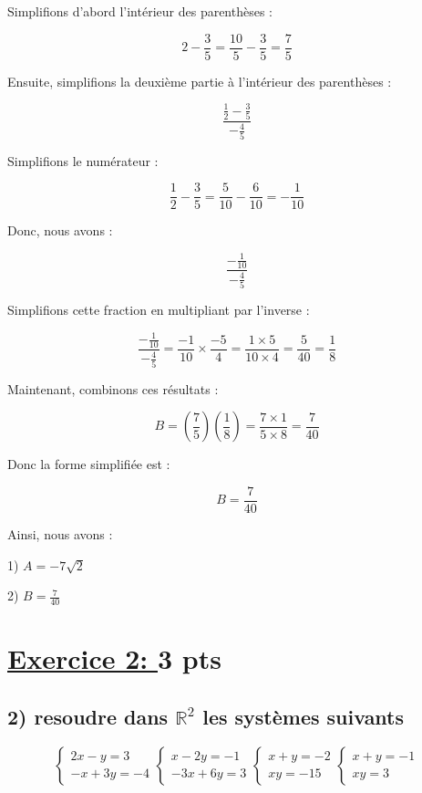 \documentclass[12pt]{article}
\begin{document}
Simplifions d'abord l'intérieur des parenthèses :

\[
2 - \frac{3}{5} = \frac{10}{5} - \frac{3}{5} = \frac{7}{5}
\]

Ensuite, simplifions la deuxième partie à l'intérieur des parenthèses :

\[
\frac{\frac{1}{2} - \frac{3}{5}}{-\frac{4}{5}}
\]

Simplifions le numérateur :

\[
\frac{1}{2} - \frac{3}{5} = \frac{5}{10} - \frac{6}{10} = -\frac{1}{10}
\]

Donc, nous avons :

\[
\frac{-\frac{1}{10}}{-\frac{4}{5}}
\]

Simplifions cette fraction en multipliant par l'inverse :

\[
\frac{-\frac{1}{10}}{-\frac{4}{5}} = \frac{-1}{10} \times \frac{-5}{4} = \frac{1 \times 5}{10 \times 4} = \frac{5}{40} = \frac{1}{8}
\]

Maintenant, combinons ces résultats :

\[
B = \left( \frac{7}{5} \right) \left( \frac{1}{8} \right) = \frac{7 \times 1}{5 \times 8} = \frac{7}{40}
\]

Donc la forme simplifiée est :

\[
B = \frac{7}{40}
\]

Ainsi, nous avons :

1) \( A = -7\sqrt{2} \)

2) \( B = \frac{7}{40} \)


\section*{\underline{Exercice 2: }\textbf{3 pts}}
\subsection*{2) resoudre dans $\mathbb{R}^{2}$ les systèmes suivants } 
\[
\begin{cases}
2x - y = 3 \\
-x + 3y = -4
\end{cases}
\begin{cases}
x - 2y = -1 \\
-3x + 6y = 3
\end{cases}
\begin{cases}
x + y = -2 \\
xy = -15
\end{cases}
\begin{cases}
x + y = -1 \\
xy = 3
\end{cases}
\]
\end{document}
